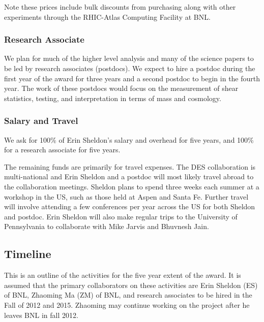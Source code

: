 \documentclass[12pt]{article}
\begin{document}
Note these prices include bulk discounts from purchasing along with other
experiments through the RHIC-Atlas Computing Facility at BNL.  



\subsubsection{Research Associate}

We plan for much of the higher level analysis and many of the science papers to
be led by research associates (postdocs).  We expect to hire a postdoc during
the first year of the award for three years and a second postdoc to begin in
the fourth year.  The work of these postdocs would focus on the measurement of
shear statistics, testing, and interpretation in terms of mass and cosmology.  

\subsubsection{Salary and Travel}

We ask for 100\%  of Erin Sheldon's salary and overhead for five years, and
100\% for a research associate for five years.

The remaining funds are primarily for travel expenses.   The DES collaboration
is multi-national and Erin Sheldon and a postdoc will most likely travel abroad
to the collaboration meetings.  Sheldon plans to spend three weeks each summer
at a workshop in the US, such as those held at Aspen and Santa Fe.  Further
travel will involve attending a few conferences per year across the US for both
Sheldon and postdoc.  Erin Sheldon will also make regular trips to the
University of Pennsylvania to collaborate with Mike Jarvis and Bhuvnesh Jain.

\clearpage
\newpage
\subsection{Timeline}

This is an outline of the activities for the five year extent of the award.  It
is assumed that the primary collaborators on these activities are Erin Sheldon
(ES) of BNL, Zhaoming Ma (ZM) of BNL, and research associates to be hired in
the Fall of 2012 and 2015.  Zhaoming may continue working on the project after
he leaves BNL in fall 2012.
\end{document}

